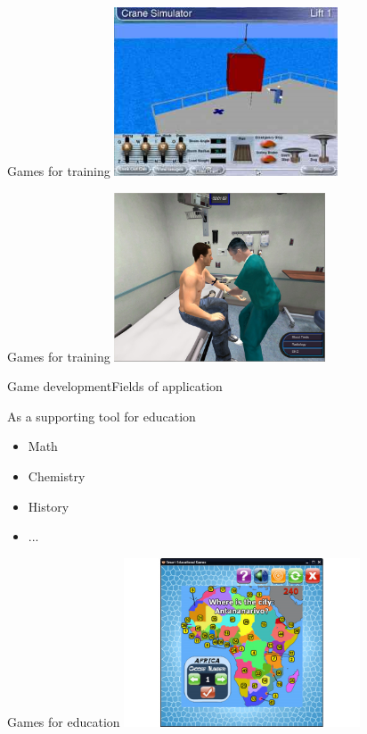 \documentclass{beamer}
\begin{document}
\begin{frame}{Games for training}
\center
\includegraphics[height=5cm]{Pics/crane_simulator.png}
\end{frame}

\begin{frame}{Games for training}
\center
\includegraphics[height=5cm]{Pics/medical_simulator.png}
\end{frame}

\begin{slide}{Game development}{Fields of application}{
\item As a supporting tool for education \cite{GAMES_FOR_EDUCATION}
\begin{itemize}
\item Math
\item Chemistry
\item History
\item ...
\end{itemize}
}\end{slide}

\begin{frame}{Games for education}
\center
\includegraphics[height=5cm]{Pics/game_for_education.png}
\end{frame}
\end{document}
